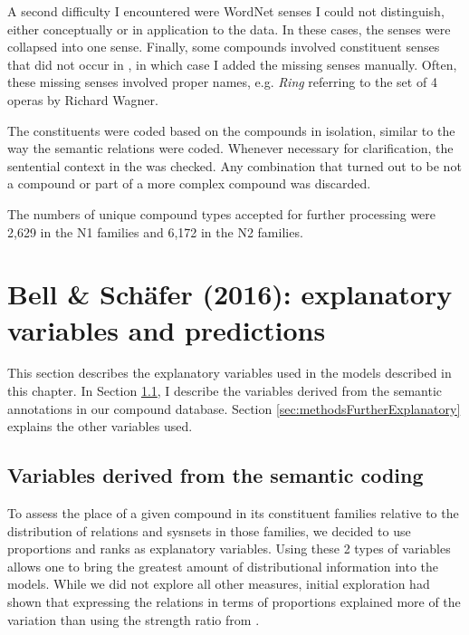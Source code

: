 A second difficulty I encountered were WordNet senses I could not distinguish, either conceptually or in application to
the data. In these cases, the senses were collapsed into one
sense. Finally, some compounds involved constituent senses that did
not occur in , in which case I added the missing senses manually.
Often, these missing senses involved proper names, e.g. \emph{Ring} referring
to the set of 4 operas by Richard Wagner. 

\enlargethispage{1\baselineskip}
The constituents were coded based on the compounds in
isolation, similar to the way the semantic relations were coded. Whenever necessary for clarification, the sentential context in the  was
checked. Any combination that turned out to be not a compound or part
of a more complex compound was discarded.  

The numbers of unique compound types accepted for further processing
were 2,629 in the N1 families and 6,172 in the N2 families.

\section[Variables and predictions]{Bell \& Schäfer (2016): explanatory variables and predictions}
\label{sec:bellschaefer2016_further-and-predictions}

This section describes the explanatory variables used in the models
described in this chapter. In Section \ref{sec:semcoding}, I describe
the variables derived from the semantic annotations in our compound
database. Section \ref{sec:methodsFurtherExplanatory} explains the
other variables used.

\subsection{Variables derived from the semantic coding}
\label{sec:semcoding}

To assess the place of a given compound in its constituent families relative to the distribution of relations and sysnsets in those families, we decided to use proportions
and ranks as explanatory variables. Using these 2 types of variables
allows one to bring the greatest amount of distributional information
into the models. While we did not explore all other measures, initial
exploration had shown that expressing the relations in terms of
proportions explained more of the variation than using the 
strength ratio from \citet{GagneandShoben:1997}.

